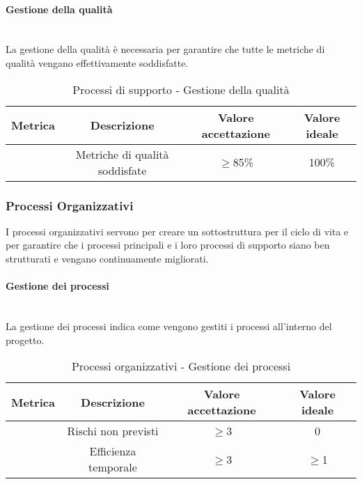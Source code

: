 \documentclass[11pt]{article}
\begin{document}
\begin{justify}
\newpage

\paragraph{Gestione della qualità}\mbox{}\\
La gestione della qualità è necessaria per garantire che tutte le metriche di qualità vengano effettivamente soddisfatte.\\
\begin{table}[H]
  \centering
\begin{tabular}{|c|c|c|c|}
  \hline
  \textbf{Metrica} & \textbf{Descrizione} & \textbf{Valore accettazione} & \textbf{Valore ideale}\\
  \hline
  & Metriche di qualità soddisfate & $\geq$85\% & 100\% \\
  \hline
\end{tabular}
\caption{Processi di supporto - Gestione della qualità}
\label{tab:gestione della qualità}
\end{table}

\subsubsection{Processi Organizzativi}
I processi organizzativi servono per creare un sottostruttura per il ciclo di vita e
per garantire che i processi principali e i loro processi di supporto siano ben strutturati e vengano continuamente migliorati.\\
\paragraph{Gestione dei processi}\mbox{}\\
La gestione dei processi indica come vengono gestiti i processi all'interno del progetto.\\
\begin{table}[H]
  \centering
\begin{tabular}{|c|c|c|c|}
  \hline
  \textbf{Metrica} & \textbf{Descrizione} & \textbf{Valore accettazione} & \textbf{Valore ideale}\\
  \hline
  & Rischi non previsti & $\geq$3 & 0 \\
  \hline
  & Efficienza temporale & $\geq$3 & $\geq$1 \\
  \hline
\end{tabular}
\caption{Processi organizzativi - Gestione dei processi}
\label{tab:gestione dei processi}
\end{table}

\end{justify}
\end{document}
